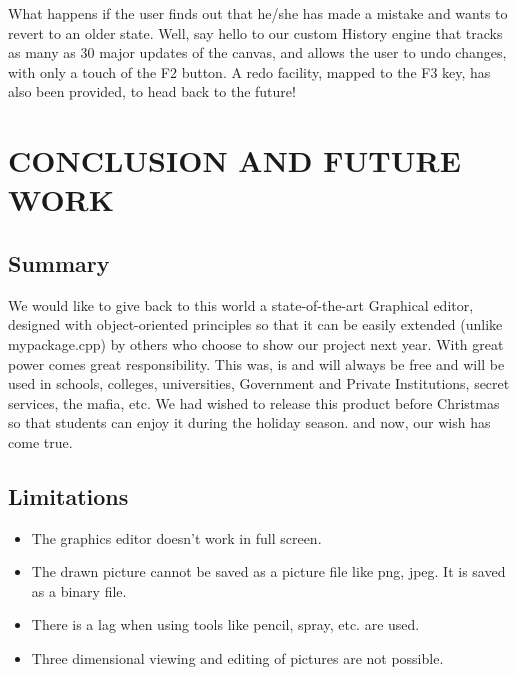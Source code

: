 \documentclass[12pt]{report}
\begin{document}
What happens if the user finds out that he/she has made a mistake and wants to revert to an older state. Well, say hello to our custom History engine that tracks as many as 30 major updates of the canvas, and allows the user to undo changes, with only a touch of the F2 button. A redo facility, mapped to the F3 key, has also been provided, to head back to the future!





\pagestyle{fancy}
\chead{}
\rfoot{\small{\thepage}}
\renewcommand{\headrulewidth}{0.4pt}
\renewcommand{\footrulewidth}{0.4pt}
\chapter{CONCLUSION AND FUTURE WORK}

\section{Summary}
We would like to give back to this world a state-of-the-art Graphical editor, designed with object-oriented principles so that it can be easily extended (unlike mypackage.cpp) by others who choose to show our project next year. With great power comes great responsibility. This was, is and will always be free and will be used in schools, colleges, universities, Government and Private Institutions, secret services, the mafia, etc. We had wished to release this product before Christmas so that students can enjoy it during the holiday season. and now, our wish has come true.

\section{Limitations}
\begin{itemize}
\item{}The graphics editor doesn't work in full screen.
\item{} The drawn picture cannot be saved as a picture file like png, jpeg. It is saved as  a binary file.
\item{}	There is a lag when using tools like pencil, spray, etc. are used.
\item{}	Three dimensional viewing and editing of pictures are not possible. 
\end{itemize}
\end{document}
